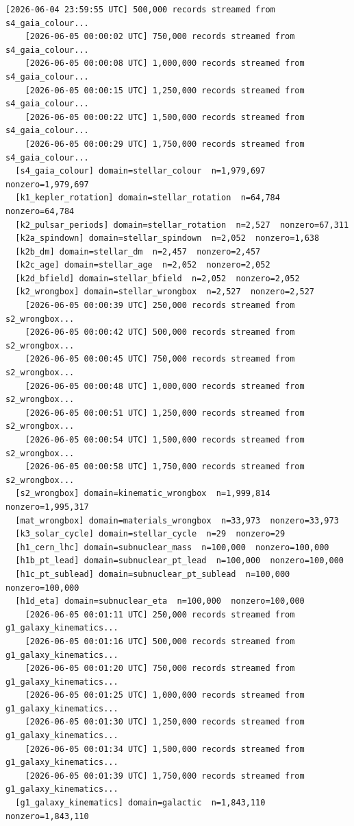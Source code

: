 \documentclass[11pt, letterpaper, openany]{book}
\begin{document}
\begin{empiricalbox}
\begin{lstlisting}[style=terminal]
    [2026-06-04 23:59:55 UTC] 500,000 records streamed from s4_gaia_colour...
    [2026-06-05 00:00:02 UTC] 750,000 records streamed from s4_gaia_colour...
    [2026-06-05 00:00:08 UTC] 1,000,000 records streamed from s4_gaia_colour...
    [2026-06-05 00:00:15 UTC] 1,250,000 records streamed from s4_gaia_colour...
    [2026-06-05 00:00:22 UTC] 1,500,000 records streamed from s4_gaia_colour...
    [2026-06-05 00:00:29 UTC] 1,750,000 records streamed from s4_gaia_colour...
  [s4_gaia_colour] domain=stellar_colour  n=1,979,697  nonzero=1,979,697
  [k1_kepler_rotation] domain=stellar_rotation  n=64,784  nonzero=64,784
  [k2_pulsar_periods] domain=stellar_rotation  n=2,527  nonzero=67,311
  [k2a_spindown] domain=stellar_spindown  n=2,052  nonzero=1,638
  [k2b_dm] domain=stellar_dm  n=2,457  nonzero=2,457
  [k2c_age] domain=stellar_age  n=2,052  nonzero=2,052
  [k2d_bfield] domain=stellar_bfield  n=2,052  nonzero=2,052
  [k2_wrongbox] domain=stellar_wrongbox  n=2,527  nonzero=2,527
    [2026-06-05 00:00:39 UTC] 250,000 records streamed from s2_wrongbox...
    [2026-06-05 00:00:42 UTC] 500,000 records streamed from s2_wrongbox...
    [2026-06-05 00:00:45 UTC] 750,000 records streamed from s2_wrongbox...
    [2026-06-05 00:00:48 UTC] 1,000,000 records streamed from s2_wrongbox...
    [2026-06-05 00:00:51 UTC] 1,250,000 records streamed from s2_wrongbox...
    [2026-06-05 00:00:54 UTC] 1,500,000 records streamed from s2_wrongbox...
    [2026-06-05 00:00:58 UTC] 1,750,000 records streamed from s2_wrongbox...
  [s2_wrongbox] domain=kinematic_wrongbox  n=1,999,814  nonzero=1,995,317
  [mat_wrongbox] domain=materials_wrongbox  n=33,973  nonzero=33,973
  [k3_solar_cycle] domain=stellar_cycle  n=29  nonzero=29
  [h1_cern_lhc] domain=subnuclear_mass  n=100,000  nonzero=100,000
  [h1b_pt_lead] domain=subnuclear_pt_lead  n=100,000  nonzero=100,000
  [h1c_pt_sublead] domain=subnuclear_pt_sublead  n=100,000  nonzero=100,000
  [h1d_eta] domain=subnuclear_eta  n=100,000  nonzero=100,000
    [2026-06-05 00:01:11 UTC] 250,000 records streamed from g1_galaxy_kinematics...
    [2026-06-05 00:01:16 UTC] 500,000 records streamed from g1_galaxy_kinematics...
    [2026-06-05 00:01:20 UTC] 750,000 records streamed from g1_galaxy_kinematics...
    [2026-06-05 00:01:25 UTC] 1,000,000 records streamed from g1_galaxy_kinematics...
    [2026-06-05 00:01:30 UTC] 1,250,000 records streamed from g1_galaxy_kinematics...
    [2026-06-05 00:01:34 UTC] 1,500,000 records streamed from g1_galaxy_kinematics...
    [2026-06-05 00:01:39 UTC] 1,750,000 records streamed from g1_galaxy_kinematics...
  [g1_galaxy_kinematics] domain=galactic  n=1,843,110  nonzero=1,843,110

\end{lstlisting}
\end{empiricalbox}
\end{document}
